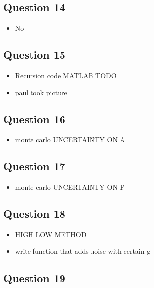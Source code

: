\documentclass[11pt,a4paper]{article}
\begin{document}
\subsection*{Question 14}
\begin{itemize}
	\item No
\end{itemize}

\subsection*{Question 15}
\begin{itemize}
	\item Recursion code MATLAB TODO
	\item paul took picture
\end{itemize}

\subsection*{Question 16}
\begin{itemize}
	\item monte carlo UNCERTAINTY ON A
\end{itemize}

\subsection*{Question 17}
\begin{itemize}
	\item monte carlo UNCERTAINTY ON F
\end{itemize}

\subsection*{Question 18}
\begin{itemize}
	\item HIGH LOW METHOD
	\item write function that adds noise with certain g
\end{itemize}

\subsection*{Question 19}
\end{document}

